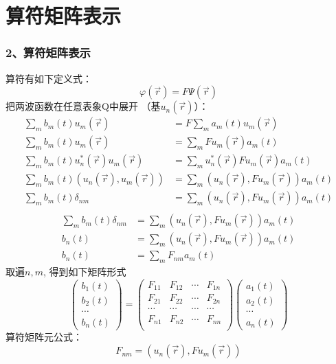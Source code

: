 \section{算符矩阵表示}
\begin{frame} [allowframebreaks=]
    \frametitle{2、算符矩阵表示}    
    算符有如下定义式：
    \begin{equation*}
        \varphi(\vec{r})=F\Psi(\vec{r}) 
    \end{equation*}  
    把两波函数在任意表象Q中展开 （基$u_n(\vec{r})$）：\\
    \begin{equation*}
        \begin{split} 
         \sum_m b_m(t)u_m(\vec{r})&= F\sum_m a_m(t)u_m(\vec{r}) \\
         \sum_m b_m(t)u_m(\vec{r})&= \sum_m Fu_m(\vec{r})a_m(t) \\
         \sum_m b_m(t)u_n ^*(\vec{r}) u_m(\vec{r})&= \sum_m u_n ^*(\vec{r}) Fu_m(\vec{r})a_m(t) \\
         \sum_m b_m(t)(u_n (\vec{r}), u_m(\vec{r}))&= \sum_m (u_n (\vec{r}), Fu_m(\vec{r}))a_m(t) \\
         \sum_m b_m(t)\delta_{nm}&= \sum_m (u_n (\vec{r}), Fu_m(\vec{r}))a_m(t) \\
        \end{split}  
    \end{equation*} 
    \begin{equation*}
        \begin{split} 
         \sum_m b_m(t)\delta_{nm}&= \sum_m (u_n (\vec{r}), Fu_m(\vec{r}))a_m(t) \\
         b_n(t)&= \sum_m (u_n (\vec{r}), Fu_m(\vec{r}))a_m(t) \\
         b_n(t)&= \sum_m F_{nm} a_m(t) 
        \end{split}  
    \end{equation*} 
    取遍$n, m$, 得到如下矩阵形式\\
    $$\begin{pmatrix}
        b_1(t)\\
        b_2(t)\\
        \cdots \\
        b_n(t)
    \end{pmatrix}
    =
    \begin{pmatrix}
       F_{11} & F_{12} & \cdots & F_{1n} \\
       F_{21} & F_{22} & \cdots & F_{2n} \\
       \cdots & \cdots &  \cdots& \cdots\\
        F_{n1} & F_{n2} & \cdots & F_{nn} \\
    \end{pmatrix}
    \begin{pmatrix}
        a_1(t)\\
        a_2(t)\\
        \cdots \\
        a_n(t)
    \end{pmatrix}
    $$
    算符矩阵元公式： $$ F_{nm}=(u_n (\vec{r}), Fu_m(\vec{r})) $$
\end{frame} 

